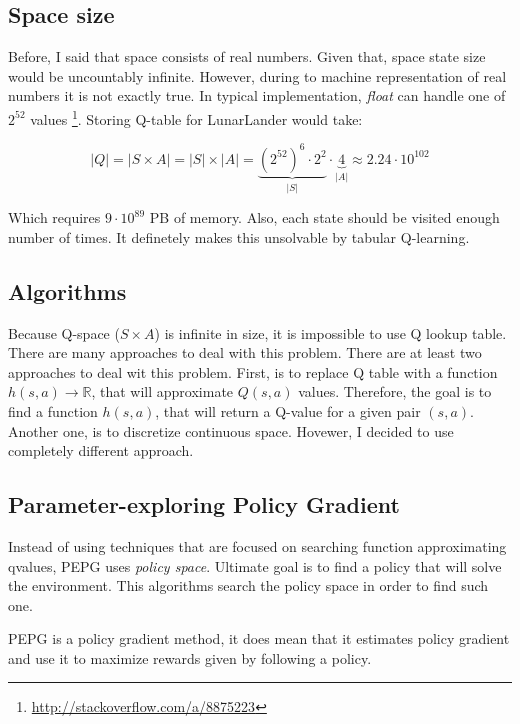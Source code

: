 \documentclass[12pt]{article}
\begin{document}
\subsection{Space size}

Before, I said that space consists of real numbers. Given that, space state size  would be uncountably infinite. However, during to machine representation of real numbers it is not exactly true. In typical implementation, \emph{float} can handle one of $2^{52}$ values \footnote{\url{http://stackoverflow.com/a/8875223}}. Storing Q-table for LunarLander would take:

\begin{equation}
|Q| = |S \times A| = |S| \times |A| = \underbrace{{(2^{52})}^6 \cdot 2^2}_{|S|} \cdot \underbrace{4}_{|A|} \approx 2.24 \cdot 10^{102}
\end{equation}

Which requires $9 \cdot 10^{89}$ PB of memory. Also, each state should be visited enough number of times. It definetely makes this unsolvable by tabular Q-learning.

\subsection{Algorithms}

Because Q-space ($S \times A$) is infinite in size, it is impossible to use Q lookup table. There are many approaches to deal with this problem. There are at least two approaches to deal wit this problem. First, is to replace Q table with a function $h(s,a) \rightarrow \mathbb{R}$, that will approximate $Q(s, a)$ values. Therefore, the goal is to find a function $h(s, a)$, that will return a Q-value for a given pair $(s,a)$. Another one, is to discretize continuous space. Hovewer, I decided to use completely different approach.

\subsection{Parameter-exploring Policy Gradient}
Instead of using techniques that are focused on searching function approximating qvalues, PEPG uses \emph{policy space}. Ultimate goal is to find a policy that will solve the environment. This algorithms search  the policy space in order to find such one. 

PEPG is a policy gradient method, it does mean that it estimates policy gradient and use it to maximize rewards given by following a policy.
\end{document}
